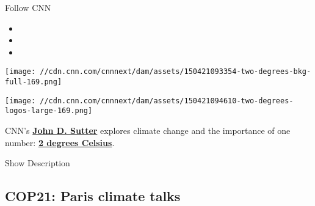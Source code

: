 Follow CNN

\begin{itemize}
\item
\item
\item
\end{itemize}

\texttt{[image: //cdn.cnn.com/cnnnext/dam/assets/150421093354-two-degrees-bkg-full-169.png]}

\texttt{[image: //cdn.cnn.com/cnnnext/dam/assets/150421094610-two-degrees-logos-large-169.png]}

CNN's \href{http://twitter.com/jdsutter}{\textbf{John D. Sutter}}
explores climate change and the importance of one number:
\href{http://tinyletter.com/jdsutter}{\textbf{2 degrees Celsius}}.

Show Description

\hypertarget{cop21-paris-climate-talks-}{%
\subsection{COP21: Paris climate
talks~}\label{cop21-paris-climate-talks-}}

